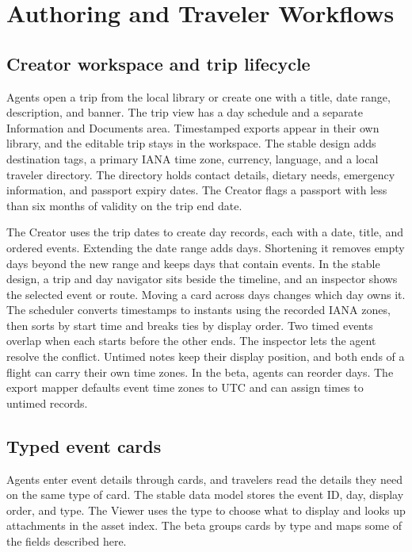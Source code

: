 \section{Authoring and Traveler Workflows}
\label{sec:features}

\subsection{Creator workspace and trip lifecycle}
Agents open a trip from the local library or create one with a title, date range, description, and banner. The trip view has a day schedule and a separate Information and Documents area. Timestamped exports appear in their own library, and the editable trip stays in the workspace. The stable design adds destination tags, a primary IANA time zone, currency, language, and a local traveler directory. The directory holds contact details, dietary needs, emergency information, and passport expiry dates. The Creator flags a passport with less than six months of validity on the trip end date.

The Creator uses the trip dates to create day records, each with a date, title, and ordered events. Extending the date range adds days. Shortening it removes empty days beyond the new range and keeps days that contain events. In the stable design, a trip and day navigator sits beside the timeline, and an inspector shows the selected event or route. Moving a card across days changes which day owns it. The scheduler converts timestamps to instants using the recorded IANA zones, then sorts by start time and breaks ties by display order. Two timed events overlap when each starts before the other ends. The inspector lets the agent resolve the conflict. Untimed notes keep their display position, and both ends of a flight can carry their own time zones. In the beta, agents can reorder days. The export mapper defaults event time zones to UTC and can assign times to untimed records.

\subsection{Typed event cards}
Agents enter event details through cards, and travelers read the details they need on the same type of card. The stable data model stores the event ID, day, display order, and type. The Viewer uses the type to choose what to display and looks up attachments in the asset index. The beta groups cards by type and maps some of the fields described here.

